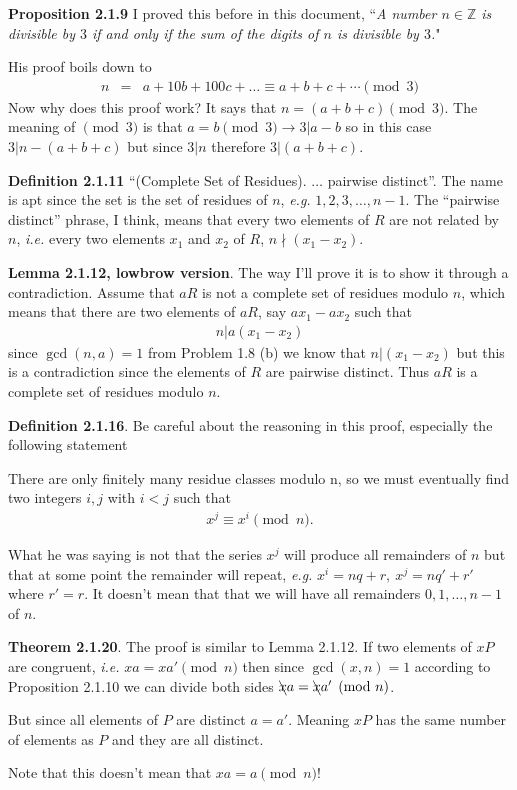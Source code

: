 \documentclass[aps,preprint,preprintnumbers,nofootinbib,showpacs,prd]{revtex4-1}
\newcommand{\ie}{{\it i.e.} }
\newcommand{\eg}{{\it e.g.} }
\newcommand{\nbea}{\begin{eqnarray*}}
\newcommand{\neea}{\end{eqnarray*}}
\begin{document}
{\bf Proposition 2.1.9} I proved this before in this document, ``{\it A number $n \in \mathbb{Z}$ is divisible by $3$ if and only if the sum of the digits of $n$ is divisible by $3$.}"

His proof boils down to
%
\nbea
n & = & a + 10b + 100c + \dots \equiv a +b+ c + \cdots \pmod{3}
\neea
%
Now why does this proof work? It says that $n = (a+b+c)\pmod{3}$. The meaning of $\pmod{3}$ is that $a = b\pmod{3} \to 3 | a-b$ so in this case $3 | n - (a+b+c)$ but since $3|n$ therefore $3|(a+b+c).$

{\bf Definition 2.1.11} ``(Complete Set of Residues). $\dots$ pairwise distinct''. The name is apt since the set is the set of residues of $n$, \eg $1,2,3,\dots,n-1$. The ``pairwise distinct'' phrase, I think, means that every two elements of $R$ are not related by $n$, \ie every two elements $x_1$ and $x_2$ of $R$, $n \nmid (x_1 - x_2)$.

{\bf Lemma 2.1.12, lowbrow version}. The way I'll prove it is to show it through a contradiction. Assume that $aR$ is not a complete set of residues modulo $n$, which means that there are two elements of $aR$, say $ax_1 - ax_2$ such that
%
\nbea
n | a(x_1 - x_2)
\neea
%
since $\gcd(n,a) = 1$ from Problem 1.8 (b) we know that $n|(x_1 - x_2)$ but this is a contradiction since the elements of $R$ are pairwise distinct. Thus $aR$ is a complete set of residues modulo $n$.

{\bf Definition 2.1.16}. Be careful about the reasoning in this proof, especially the following statement

There are only finitely many residue classes modulo n, so we must eventually ﬁnd two integers $i, j$ with $i < j$ such that
%
\nbea
x^j \equiv x^i \pmod{n}.
\neea
%

What he was saying is not that the series $x^j$ will produce all remainders of $n$ but that at some point the remainder will repeat, \eg $x^i = nq + r,~x^j = nq' + r'$ where $r' = r$. It doesn't mean that that we will have all remainders $0,1, \dots, n-1$ of $n$.

{\bf Theorem 2.1.20}. The proof is similar to Lemma 2.1.12. If two elements of $xP$ are congruent, \ie $xa = xa' \pmod{n}$ then since $\gcd(x,n)=1$ according to Proposition 2.1.10 we can divide both sides $\bcancel{x}a = \bcancel{x}a' \pmod{n}$.

But since all elements of $P$ are distinct $a = a'$. Meaning $xP$ has the same number of elements as $P$ and they are all distinct.

Note that this doesn't mean that $xa = a \pmod{n}$!
\end{document}
